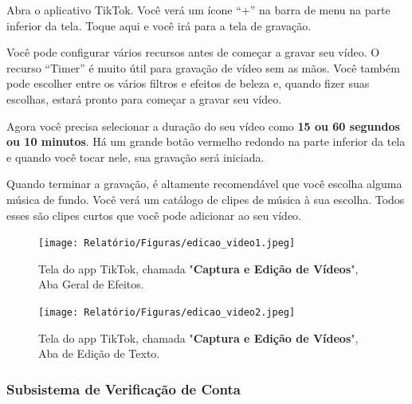 Abra o aplicativo TikTok. Você verá um ícone “+” na barra de menu na parte inferior da tela. Toque aqui e você irá para a tela de gravação.\vskip0.3cm

Você pode configurar vários recursos antes de começar a gravar seu vídeo. O recurso “Timer” é muito útil para gravação de vídeo sem as mãos. Você também pode escolher entre os vários filtros e efeitos de beleza e, quando fizer suas escolhas, estará pronto para começar a gravar seu vídeo.\vskip0.3cm

Agora você precisa selecionar a duração do seu vídeo como\textbf{ 15 ou 60 segundos ou 10 minutos}. Há um grande botão vermelho redondo na parte inferior da tela e quando você tocar nele, sua gravação será iniciada.\vskip0.3cm

Quando terminar a gravação, é altamente recomendável que você escolha alguma música de fundo. Você verá um catálogo de clipes de música à sua escolha. Todos esses são clipes curtos que você pode adicionar ao seu vídeo.



\begin{figure}[H]
    \centering
    \begin{minipage}{0.45\textwidth}
        \centering
        \texttt{[image: Relatório/Figuras/edicao\_video1.jpeg]}
        \caption{Tela do app TikTok, chamada "\textbf{Captura e Edição de Vídeos}", Aba Geral de Efeitos.}
        \label{fig:promover_publicacao1}
    \end{minipage}\hfill
    \begin{minipage}{0.45\textwidth}
        \centering
        \texttt{[image: Relatório/Figuras/edicao\_video2.jpeg]}
        \caption{Tela do app TikTok, chamada "\textbf{Captura e Edição de Vídeos}", Aba de Edição de Texto.}
        \label{fig:promover_publicacao2}
    \end{minipage}
\end{figure}







\newpage
\subsubsection{Subsistema de Verificação de Conta}


